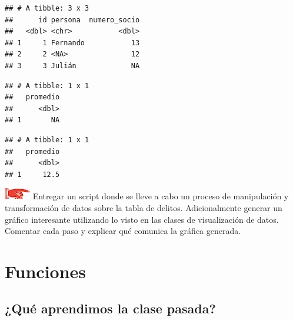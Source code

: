 \documentclass[]{book}
\newenvironment{Shaded}{\begin{snugshade}}{\end{snugshade}}
\newcommand{\KeywordTok}[1]{\textcolor[rgb]{0.13,0.29,0.53}{\textbf{#1}}}
\newcommand{\DataTypeTok}[1]{\textcolor[rgb]{0.13,0.29,0.53}{#1}}
\newcommand{\StringTok}[1]{\textcolor[rgb]{0.31,0.60,0.02}{#1}}
\newcommand{\CommentTok}[1]{\textcolor[rgb]{0.56,0.35,0.01}{\textit{#1}}}
\newcommand{\OtherTok}[1]{\textcolor[rgb]{0.56,0.35,0.01}{#1}}
\newcommand{\OperatorTok}[1]{\textcolor[rgb]{0.81,0.36,0.00}{\textbf{#1}}}
\newcommand{\NormalTok}[1]{#1}
\theoremstyle{definition}
\theoremstyle{definition}
\theoremstyle{definition}
\theoremstyle{remark}
\begin{document}
\begin{verbatim}
## # A tibble: 3 x 3
##      id persona  numero_socio
##   <dbl> <chr>           <dbl>
## 1     1 Fernando           13
## 2     2 <NA>               12
## 3     3 Julián             NA
\end{verbatim}

\begin{Shaded}
\end{Shaded}

\begin{verbatim}
## # A tibble: 1 x 1
##   promedio
##      <dbl>
## 1       NA
\end{verbatim}

\begin{Shaded}
\end{Shaded}

\begin{verbatim}
## # A tibble: 1 x 1
##   promedio
##      <dbl>
## 1     12.5
\end{verbatim}

\includegraphics{./imagenes/manicule.jpg} Entregar un script donde se
lleve a cabo un proceso de manipulación y transformación de datos sobre
la tabla de delitos. Adicionalmente generar un gráfico interesante
utilizando lo visto en las clases de visualización de datos. Comentar
cada paso y explicar qué comunica la gráfica generada.

\chapter{Funciones}\label{funciones}

\section{¿Qué aprendimos la clase
pasada?}\label{que-aprendimos-la-clase-pasada-2}
\end{document}
